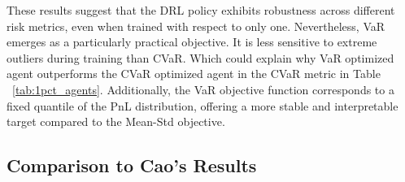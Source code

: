 \documentclass[a4paper,fleqn]{cas-dc}
\begin{document}
These results suggest that the DRL policy exhibits robustness across different risk metrics, even when trained with respect to only one. Nevertheless, VaR emerges as a particularly practical objective. It is less sensitive to extreme outliers during training than CVaR. Which could explain why VaR optimized agent outperforms the CVaR optimized agent in the CVaR metric in Table ~\ref{tab:1pct_agents}. Additionally, the VaR objective function corresponds to a fixed quantile of the PnL distribution, offering a more stable and interpretable target compared to the Mean-Std objective.



\subsection{Comparison to Cao's \cite{DH_1} Results} \label{sec:cao_comparison}
\end{document}
